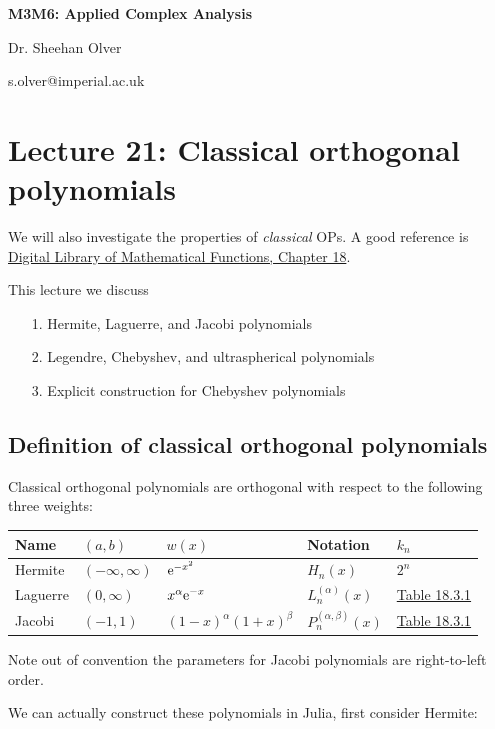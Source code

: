 \documentclass[12pt,a4paper]{article}
\def\E{ {\rm e} }
\begin{document}
\textbf{M3M6: Applied Complex Analysis}

Dr. Sheehan Olver

s.olver@imperial.ac.uk

\section{Lecture 21: Classical orthogonal polynomials}
We will also investigate the properties of \emph{classical} OPs. A good reference is  \href{http://dlmf.nist.gov/18}{Digital Library of Mathematical Functions, Chapter 18}.

This lecture we discuss

\begin{itemize}
\item[1. ] Hermite, Laguerre, and Jacobi polynomials


\item[2. ] Legendre, Chebyshev, and ultraspherical polynomials


\item[3. ] Explicit construction for Chebyshev polynomials

\end{itemize}
\subsection{Definition of classical orthogonal polynomials}
Classical orthogonal polynomials are orthogonal with respect to the following three weights:

\begin{tabular}
{l | l | l | l | l}
Name & $(a,b)$ & $w(x)$ & Notation & $k_n$ \\
\hline
Hermite & $(-\infty,\infty)$ & $\E^{-x^2}$ & $H_n(x)$ & $2^n$ \\
Laguerre & $(0,\infty)$ & $x^\alpha \E^{-x}$ & $L_n^{(\alpha)}(x)$ & \href{http://dlmf.nist.gov/18.3}{Table 18.3.1} \\
Jacobi & $(-1,1)$ & $(1-x)^{\alpha} (1+x)^\beta$ & $P_n^{(\alpha,\beta)}(x)$ & \href{http://dlmf.nist.gov/18.3}{Table 18.3.1} \\
\end{tabular}
Note out of convention the parameters for Jacobi polynomials are right-to-left order.

We can actually construct these polynomials in Julia, first consider Hermite:
\end{document}
